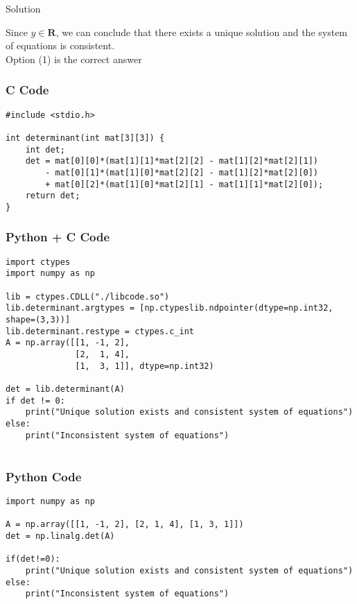 \documentclass{beamer}
\begin{document}
\begin{frame}{Solution}

Since $y  \in \mathbf{R}$, we can conclude that there exists a unique solution and the system of equations is consistent. \\

Option (1) is the correct answer

\end{frame}

\begin{frame}[fragile]
    \frametitle{C Code}
    \begin{lstlisting}
#include <stdio.h>

int determinant(int mat[3][3]) {
    int det;
    det = mat[0][0]*(mat[1][1]*mat[2][2] - mat[1][2]*mat[2][1])
        - mat[0][1]*(mat[1][0]*mat[2][2] - mat[1][2]*mat[2][0])
        + mat[0][2]*(mat[1][0]*mat[2][1] - mat[1][1]*mat[2][0]);
    return det;
}

    \end{lstlisting}
\end{frame}
\begin{frame}[fragile]
    \frametitle{Python + C Code}
    \begin{lstlisting}
import ctypes
import numpy as np

lib = ctypes.CDLL("./libcode.so")
lib.determinant.argtypes = [np.ctypeslib.ndpointer(dtype=np.int32, shape=(3,3))]
lib.determinant.restype = ctypes.c_int
A = np.array([[1, -1, 2],
              [2,  1, 4],
              [1,  3, 1]], dtype=np.int32)

det = lib.determinant(A)
if det != 0:
    print("Unique solution exists and consistent system of equations")
else:
    print("Inconsistent system of equations")


    \end{lstlisting}
\end{frame}

\begin{frame}[fragile]
    \frametitle{Python Code}
    \begin{lstlisting}
import numpy as np

A = np.array([[1, -1, 2], [2, 1, 4], [1, 3, 1]])
det = np.linalg.det(A)
	
if(det!=0):
	print("Unique solution exists and consistent system of equations")
else:
	print("Inconsistent system of equations")


    \end{lstlisting}
\end{frame}
\end{document}
